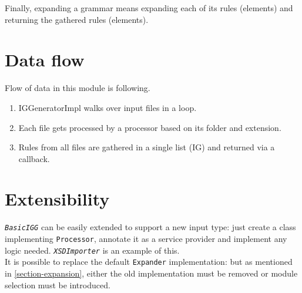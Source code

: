 \documentclass[a4paper,10pt,oneside]{article}
\newcommand{\code}[1]{\texttt{#1}}
\newcommand{\jmodule}[1]{\texttt{\textit{#1}}}
\begin{document}
Finally, expanding a grammar means expanding each of its rules (elements) and returning the gathered rules (elements).

\section{Data flow}

Flow of data in this module is following.
\begin{enumerate}
	\item IGGeneratorImpl walks over input files in a loop.
	\item Each file gets processed by a processor based on its folder and extension.
	\item Rules from all files are gathered in a single list (IG) and returned via a callback.
\end{enumerate}

\section{Extensibility}

\jmodule{BasicIGG} can be easily extended to support a new input type: just create a class implementing \code{Processor}, annotate it as a service provider and implement any logic needed. \jmodule{XSDImporter} is an example of this.\\

It is possible to replace the default \code{Expander} implementation: but as mentioned in \ref{section-expansion}, either the old implementation must be removed or module selection must be introduced.

\newpage


\end{document}
